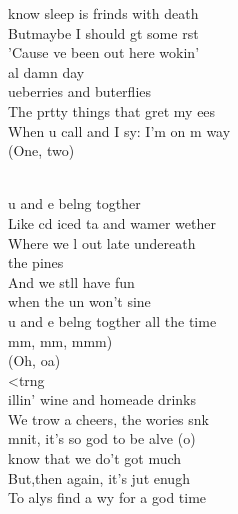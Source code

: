 \begin{cancion}%
	know sleep is frinds with death\\
	Butmaybe I should gt some rst\\
	'Cause ve been out here wokin' \\
	al damn day   \\
	ueberries and buterflies\\
	The prtty things that gret my ees\\
	When u call and I sy: I'm on m way\\
(One, two)\\\jump\\
	\begin{chorus}%
	u and e belng togther\\
	Like cd iced ta and wamer wether\\
	Where we l out late undereath \\
the pines\\
	And we stll have fun \\
	when the un won't sine\\
	u and e belng togther all the time\\
\jump
	mm, mm, mmm)\\
	(Oh, oa)\\
	<trng\\
	illin' wine and homeade drinks\\
	We trow a cheers, the wories snk\\
	mnit, it's so god to be alve (o)\\
	 know that we do't got much\\
	But,then again, it's jut enugh\\
	To alys find a wy for a god time\\\jump\\

\end{chorus}
\end{cancion}
